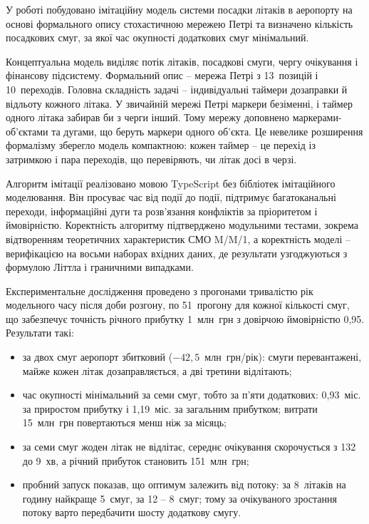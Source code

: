 
У роботі побудовано імітаційну модель системи посадки літаків в аеропорту на основі формального опису стохастичною мережею Петрі та визначено кількість посадкових смуг, за якої час окупності додаткових смуг мінімальний.

Концептуальна модель виділяє потік літаків, посадкові смуги, чергу очікування і фінансову підсистему. Формальний опис -- мережа Петрі з 13~позицій і 10~переходів. Головна складність задачі -- індивідуальні таймери дозаправки й відльоту кожного літака. У звичайній мережі Петрі маркери безіменні, і таймер одного літака забирав би з черги інший. Тому мережу доповнено маркерами-об'єктами та дугами, що беруть маркери одного об'єкта. Це невелике розширення формалізму зберегло модель компактною: кожен таймер -- це перехід із затримкою і пара переходів, що перевіряють, чи літак досі в черзі.

Алгоритм імітації реалізовано мовою TypeScript без бібліотек імітаційного моделювання. Він просуває час від події до події, підтримує багатоканальні переходи, інформаційні дуги та розв'язання конфліктів за пріоритетом і ймовірністю. Коректність алгоритму підтверджено модульними тестами, зокрема відтворенням теоретичних характеристик СМО M/M/1, а коректність моделі -- верифікацією на восьми наборах вхідних даних, де результати узгоджуються з формулою Літтла і граничними випадками.

Експериментальне дослідження проведено з прогонами тривалістю рік модельного часу після доби розгону, по 51~прогону для кожної кількості смуг, що забезпечує точність річного прибутку 1~млн~грн з довірчою ймовірністю 0,95. Результати такі:
\begin{itemize}
\item за двох смуг аеропорт збитковий ($-42{,}5$~млн~грн/рік): смуги перевантажені, майже кожен літак дозаправляється, а дві третини відлітають;
\item час окупності мінімальний за семи смуг, тобто за п'яти додаткових: 0,93~міс. за приростом прибутку і 1,19~міс. за загальним прибутком; витрати 15~млн~грн повертаються менш ніж за місяць;
\item за семи смуг жоден літак не відлітає, середнє очікування скорочується з 132 до 9~хв, а річний прибуток становить 151~млн~грн;
\item пробний запуск показав, що оптимум залежить від потоку: за 8~літаків на годину найкраще 5~смуг, за 12 -- 8~смуг; тому за очікуваного зростання потоку варто передбачити шосту додаткову смугу.
\end{itemize}

